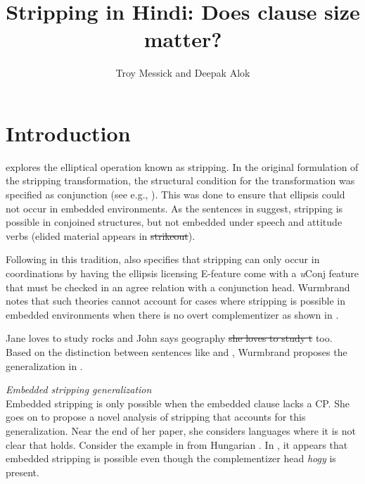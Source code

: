\documentclass[output=paper]{langscibook}
\author{Troy Messick\orcid{0000-0002-1453-5212}\affiliation{Rutgers University} and Deepak Alok\affiliation{Panligua Language Processing}}
\title{Stripping in Hindi: Does clause size matter?}
\begin{document}
\maketitle

\section{Introduction}
\citet{wurmbrand17} explores the elliptical operation known as stripping. In the original formulation of the stripping transformation, the structural condition for the transformation was specified as conjunction (see e.g.,  \citealt{hankamer79}). This was done to ensure that ellipsis could not occur in embedded environments. As the sentences in  suggest, stripping is possible in conjoined structures, but not embedded under speech and attitude verbs (elided material appears in \sout{strikeout}).

\ea \label{maex1}
    \z 
\z 
Following in this tradition, \citet{merchant03} also specifies that stripping can only occur in coordinations by having the ellipsis licensing E-feature come with a \emph{u}Conj feature that must be checked in an agree relation with a conjunction head. Wurmbrand notes that such theories cannot account for cases where stripping is possible in embedded environments when there is no overt complementizer as shown in .

\ea \label{maex2}
    Jane loves to study rocks and John says geography \sout{she loves to study t} too.
\z
Based on the distinction between sentences like  and , Wurmbrand proposes the generalization in .

\ea \label{maex3}
    \emph{Embedded stripping generalization}\\
    Embedded stripping is only possible when the embedded clause lacks a CP. 
\z
She goes on to propose a novel analysis of stripping that accounts for this generalization. Near the end of her paper, she considers languages where it is not clear that  holds. Consider the example in  from Hungarian \citep{craenenbroeck06,craenenbroeck08,craenenbroeck13}. In , it appears that embedded stripping is possible even though the complementizer head \emph{hogy} is present.
\end{document}
